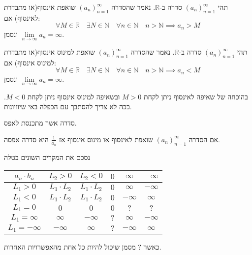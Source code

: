 \documentclass{tstextbook}
\begin{document}
\begin{definition}
תהי \((a_n)_{n=1}^\infty\) סדרה ב-\(\mathbb{R}\). נאמר שהסדרה \((a_n)_{n=1}^\infty\) שואפת אינסוף(או מתבדרת לאינסוף) אם:
$$\forall M \in \mathbb{R}\quad \exists N \in \mathbb{N}\quad \forall n \in \mathbb{N}\quad  n>\mathbb{N}\implies a_{n}>M$$
ונסמן \(\underset{ n \to \infty }{\lim }a_{n}=\infty\).

\end{definition}
\begin{definition}
תהי \((a_n)_{n=1}^\infty\) סדרה ב-\(\mathbb{R}\). נאמר שהסדרה \((a_n)_{n=1}^\infty\) שואפת למינוס אינסוף(או מתבדרת למינוס אינסוף) אם:
$$\forall M \in \mathbb{R}\quad \exists N \in \mathbb{N}\quad \forall n \in \mathbb{N}\quad  n>\mathbb{N}\implies a_{n}<M$$
ונסמן \(\underset{ n \to \infty }{\lim }a_{n}=\infty\).

\end{definition}
\begin{remark}
בהוכחה של שאיפה לאינסוף ניתן לקחת \(M>0\) ובשאיפה למינוס אינסוף ניתן לקחת \(M< 0\). ככה לא צריך להסתבך עם הכפלה באי שיוויונות.

\end{remark}
\begin{definition}
סדרה אשר מתכנסת לאפס.

\end{definition}
\begin{proposition}
אם הסדרה \((a_n)_{n=1}^\infty\) שואפת לאינסוף או מינוס אינסוף אז \(\frac{1}{a_{n}}\) היא סדרה אפסה.

\end{proposition}
נסכם את המקרים השונים בטלה

\begin{table}[htbp]
  \centering
  \begin{tabular}{|cccccc|}
    \hline
    \(a_n\cdot b_n\) & \(L_2 > 0\) & \(L_2 < 0\) & \(0\) & \(\infty\) & \(-\infty\) \\ \hline
    \(L_1>0\) & \(L_1\cdot L_2\) & \(L_1\cdot L_2\) & \(0\) & \(\infty\) & \(-\infty\) \\ \hline
    \(L_1<0\) & \(L_1\cdot L_2\) & \(L_1\cdot L_2\) & \(0\) & \(-\infty\) & \(\infty\) \\ \hline
    \(L_{1}=0\) & \(0\) & \(0\) & \(0\) & \(?\) & \(?\) \\ \hline
    \(L_{1}=\infty\) & \(\infty\) & \(-\infty\) & \(?\) & \(\infty\) & \(-\infty\) \\ \hline
    \(L_1=-\infty\) & \(-\infty\) & \(\infty\) & \(?\) & \(-\infty\) & \(\infty\) \\ \hline
  \end{tabular}
\end{table}
כאשר \(?\) מסמן שיכול להיות כל אחת מהאפשרויות האחרות.
\end{document}
